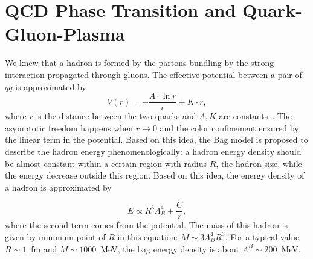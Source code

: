 \section{QCD Phase Transition and Quark-Gluon-Plasma}

We knew that a hadron is formed by the partons bundling by the strong interaction propagated through gluons. The effective potential between a pair of $q\bar q$ is approximated by
\begin{equation}
V(r) = -\frac{A\cdot\ln r}{r}+K\cdot r,
\end{equation}
where $r$ is the distance between the two quarks and $A,K$ are constants~\cite{Hands:2001ve}. The asymptotic freedom happens when $r\to 0$ and the color confinement ensured by the linear term in the potential. Based on this idea, the Bag model is proposed to describe the hadron energy phenomenologically: a hadron energy density should be almost constant within a certain region with radius $R$, the hadron size, while the energy decrease outside this region. Based on this idea, the energy density of a hadron is approximated by

\begin{equation}
E \propto R^3\Lambda_B^4 + \frac{C}{r},
\end{equation}
where the second term comes from the potential. The mass of this hadron is given by minimum point of $R$ in this equation: $M\sim 3\Lambda^4_BR^3$. For a typical value $R\sim1$~fm and $M\sim 1000$~MeV, the bag energy density is about $\Lambda^B\sim200$~MeV.

